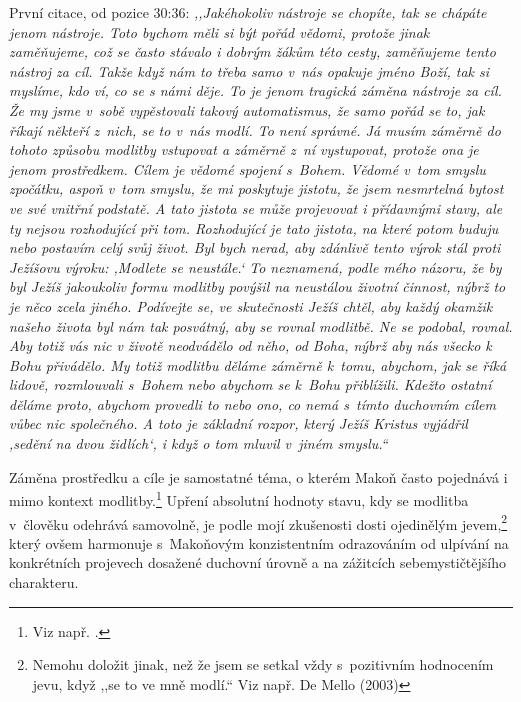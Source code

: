 \begin{enumerate}
{    První citace, od pozice 30:36: \textit{%
      ,,Jakéhokoliv nástroje se chopíte, tak se chápáte jenom nástroje. Toto
      bychom měli si být pořád vědomi, protože jinak zaměňujeme, což se často
      stávalo i dobrým žákům této cesty, zaměňujeme tento nástroj za cíl. Takže
      když nám to třeba samo v~nás opakuje jméno Boží, tak si myslíme, kdo ví,
      co se s námi děje. To je jenom tragická záměna nástroje za cíl. Že my jsme
      v~sobě vypěstovali takový automatismus, že samo pořád se to, jak říkají
      někteří z~nich, se to v~nás modlí. To není správné. Já musím záměrně do
      tohoto způsobu modlitby vstupovat a záměrně z~ní vystupovat, protože ona
      je jenom prostředkem. Cílem je vědomé spojení s~Bohem. Vědomé v~tom smyslu
      zpočátku, aspoň v~tom smyslu, že mi poskytuje jistotu, že jsem nesmrtelná
      bytost ve své vnitřní podstatě. A tato jistota se může projevovat i
      přídavnými stavy, ale ty nejsou rozhodující při tom. Rozhodující je tato
      jistota, na které potom buduju nebo postavím celý svůj život. Byl bych
      nerad, aby zdánlivě tento výrok stál proti Ježíšovu výroku: ,Modlete se
      neustále.` To neznamená, podle mého názoru, že by byl Ježíš jakoukoliv
      formu modlitby povýšil na neustálou životní činnost, nýbrž to je něco
      zcela jiného. Podívejte se, ve skutečnosti Ježíš chtěl, aby každý okamžik
      našeho života byl nám tak posvátný, aby se rovnal modlitbě. Ne se podobal,
      rovnal. Aby totiž vás nic v životě neodvádělo od něho, od Boha, nýbrž aby
      nás všecko k Bohu přivádělo. My totiž modlitbu děláme záměrně k~tomu,
      abychom, jak se říká lidově, rozmlouvali s~Bohem nebo abychom se k~Bohu
      přiblížili. Kdežto ostatní děláme proto, abychom provedli to nebo ono, co
      nemá s~tímto duchovním cílem vůbec nic společného. A toto je základní
      rozpor, který Ježíš Kristus vyjádřil ,sedění na dvou židlích`, i když o
      tom mluvil v~jiném smyslu.``
    }

    Záměna prostředku a cíle je samostatné téma, o kterém Makoň často pojednává
    i mimo kontext modlitby.\footnote{Viz např. .} Upření absolutní hodnoty stavu, kdy se modlitba
    v~člověku odehrává samovolně, je podle mojí zkušenosti dosti ojedinělým
    jevem,\footnote{Nemohu doložit jinak, než že jsem se setkal vždy s~pozitivním
    hodnocením jevu, když ,,se to ve mně modlí.`` Viz např. De Mello
    (2003)\cite{demello2003contact}} který ovšem harmonuje s~Makoňovým konzistentním odrazováním od
    ulpívání na konkrétních projevech dosažené duchovní úrovně a na zážitcích
    sebemystičtějšího charakteru.

}
\end{enumerate}
